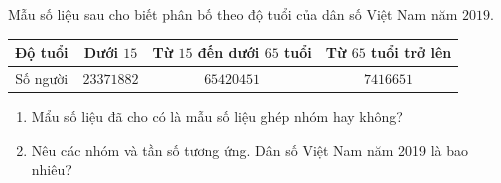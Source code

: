 \begin{vd}%
Mẫu số liệu sau cho biết phân bố theo độ tuổi của dân số Việt Nam năm $2019$.
\begin{center}
    \begin{tabular}{|c|c|c|c|}
        \hline
Độ tuổi&Dưới $15$&Từ $15$ đến dưới $65$ tuổi&Từ $65$ tuổi trở lên\\
\hline
Số người&$23371882$&$65420451$&$7416651$\\
\hline
    \end{tabular}
\end{center}
\begin{enumerate}
    \item Mẩu số liệu đã cho có là mẫu số liệu ghép nhóm hay không?
\item Nêu các nhóm và tần số tương ứng. Dân số Việt Nam năm 2019 là bao nhiêu?
\end{enumerate}
\end{vd}

